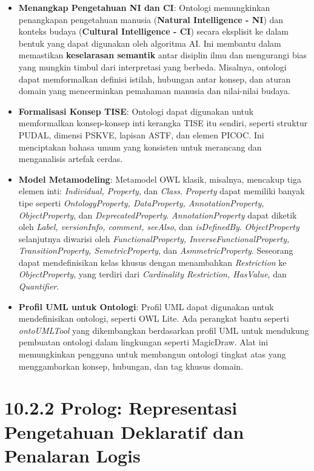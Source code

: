 \documentclass[
  letterpaper,
  DIV=11,
  numbers=noendperiod]{scrreprt}
\providecommand{\tightlist}{%
  \setlength{\itemsep}{0pt}\setlength{\parskip}{0pt}}
\begin{document}
\begin{itemize}
\tightlist
\item
  \textbf{Menangkap Pengetahuan NI dan CI}: Ontologi memungkinkan
  penangkapan pengetahuan manusia (\textbf{Natural Intelligence - NI})
  dan konteks budaya (\textbf{Cultural Intelligence - CI}) secara
  eksplisit ke dalam bentuk yang dapat digunakan oleh algoritma AI. Ini
  membantu dalam memastikan \textbf{keselarasan semantik} antar disiplin
  ilmu dan mengurangi bias yang mungkin timbul dari interpretasi yang
  berbeda. Misalnya, ontologi dapat memformalkan definisi istilah,
  hubungan antar konsep, dan aturan domain yang mencerminkan pemahaman
  manusia dan nilai-nilai budaya.
\item
  \textbf{Formalisasi Konsep TISE}: Ontologi dapat digunakan untuk
  memformalkan konsep-konsep inti kerangka TISE itu sendiri, seperti
  struktur PUDAL, dimensi PSKVE, lapisan ASTF, dan elemen PICOC. Ini
  menciptakan bahasa umum yang konsisten untuk merancang dan
  menganalisis artefak cerdas.
\item
  \textbf{Model Metamodeling}: Metamodel OWL klasik, misalnya, mencakup
  tiga elemen inti: \emph{Individual, Property}, dan \emph{Class}.
  \emph{Property} dapat memiliki banyak tipe seperti
  \emph{OntologyProperty, DataProperty, AnnotationProperty,
  ObjectProperty}, dan \emph{DeprecatedProperty}.
  \emph{AnnotationProperty} dapat diketik oleh \emph{Label, versionInfo,
  comment, seeAlso}, dan \emph{isDefinedBy}. \emph{ObjectProperty}
  selanjutnya diwarisi oleh \emph{FunctionalProperty,
  InverseFunctionalProperty, TransitionProperty, SemetricProperty}, dan
  \emph{AsmmetricProperty}. Seseorang dapat mendefinisikan kelas khusus
  dengan menambahkan \emph{Restriction} ke \emph{ObjectProperty}, yang
  terdiri dari \emph{Cardinality Restriction, HasValue}, dan
  \emph{Quantifier}.
\item
  \textbf{Profil UML untuk Ontologi}: Profil UML dapat digunakan untuk
  mendefinisikan ontologi, seperti OWL Lite. Ada perangkat bantu seperti
  \emph{ontoUMLTool} yang dikembangkan berdasarkan profil UML untuk
  mendukung pembuatan ontologi dalam lingkungan seperti MagicDraw. Alat
  ini memungkinkan pengguna untuk membangun ontologi tingkat atas yang
  menggambarkan konsep, hubungan, dan tag khusus domain.
\end{itemize}

\section{\texorpdfstring{\textbf{10.2.2 Prolog: Representasi Pengetahuan
Deklaratif dan Penalaran
Logis}}{10.2.2 Prolog: Representasi Pengetahuan Deklaratif dan Penalaran Logis}}\label{prolog-representasi-pengetahuan-deklaratif-dan-penalaran-logis}
\end{document}
